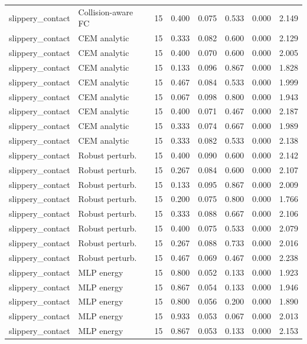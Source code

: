 {\begin{longtable}{llrrrrrr}
slippery\_contact & Collision-aware FC & 15 & 0.400 & 0.075 & 0.533 & 0.000 & 2.149 \\
slippery\_contact & CEM analytic & 15 & 0.333 & 0.082 & 0.600 & 0.000 & 2.129 \\
slippery\_contact & CEM analytic & 15 & 0.400 & 0.070 & 0.600 & 0.000 & 2.005 \\
slippery\_contact & CEM analytic & 15 & 0.133 & 0.096 & 0.867 & 0.000 & 1.828 \\
slippery\_contact & CEM analytic & 15 & 0.467 & 0.084 & 0.533 & 0.000 & 1.999 \\
slippery\_contact & CEM analytic & 15 & 0.067 & 0.098 & 0.800 & 0.000 & 1.943 \\
slippery\_contact & CEM analytic & 15 & 0.400 & 0.071 & 0.467 & 0.000 & 2.187 \\
slippery\_contact & CEM analytic & 15 & 0.333 & 0.074 & 0.667 & 0.000 & 1.989 \\
slippery\_contact & CEM analytic & 15 & 0.333 & 0.082 & 0.533 & 0.000 & 2.138 \\
slippery\_contact & Robust perturb. & 15 & 0.400 & 0.090 & 0.600 & 0.000 & 2.142 \\
slippery\_contact & Robust perturb. & 15 & 0.267 & 0.084 & 0.600 & 0.000 & 2.107 \\
slippery\_contact & Robust perturb. & 15 & 0.133 & 0.095 & 0.867 & 0.000 & 2.009 \\
slippery\_contact & Robust perturb. & 15 & 0.200 & 0.075 & 0.800 & 0.000 & 1.766 \\
slippery\_contact & Robust perturb. & 15 & 0.333 & 0.088 & 0.667 & 0.000 & 2.106 \\
slippery\_contact & Robust perturb. & 15 & 0.400 & 0.075 & 0.533 & 0.000 & 2.079 \\
slippery\_contact & Robust perturb. & 15 & 0.267 & 0.088 & 0.733 & 0.000 & 2.016 \\
slippery\_contact & Robust perturb. & 15 & 0.467 & 0.069 & 0.467 & 0.000 & 2.238 \\
slippery\_contact & MLP energy & 15 & 0.800 & 0.052 & 0.133 & 0.000 & 1.923 \\
slippery\_contact & MLP energy & 15 & 0.867 & 0.054 & 0.133 & 0.000 & 1.946 \\
slippery\_contact & MLP energy & 15 & 0.800 & 0.056 & 0.200 & 0.000 & 1.890 \\
slippery\_contact & MLP energy & 15 & 0.933 & 0.053 & 0.067 & 0.000 & 2.013 \\
slippery\_contact & MLP energy & 15 & 0.867 & 0.053 & 0.133 & 0.000 & 2.153 \\

\end{longtable}}
